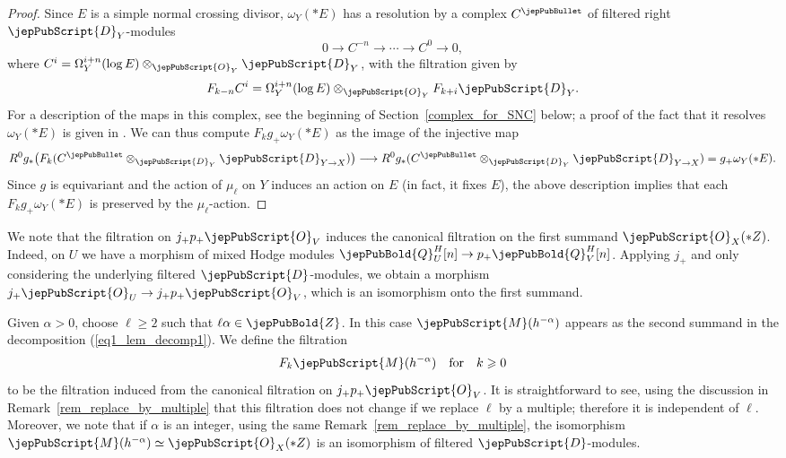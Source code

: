 \begin{proof}
Since $E$ is a simple normal crossing divisor, $\omega_Y(*E)$ has a resolution by a complex $C^\jepPubBullet$ 
of filtered right $\jepPubScript{D}_Y$-modules
$$0\longrightarrow C^{-n}\longrightarrow\cdots\longrightarrow C^0\longrightarrow 0,$$
where $C^{i}=\Omega_Y^{i+n}(\log E)\otimes_{\jepPubScript{O}_Y}\jepPubScript{D}_Y$, with the filtration given by
$$F_{k-n}C^i=\Omega_Y^{i+n}(\log E)\otimes_{\jepPubScript{O}_Y}F_{k+i}\jepPubScript{D}_Y.$$ 
For a description of the maps in this complex, see the beginning of Section~\ref{complex_for_SNC} below;
a proof
of the fact that it resolves $\omega_Y(*E)$ is given in \cite[Prop.~3.1]{MP1}. We can thus compute  $F_kg_+\omega_Y(*E)$ as the image of the injective map
$$R^0g_*\big(F_k(C^{\jepPubBullet}\otimes_{\jepPubScript{D}_Y}\jepPubScript{D}_{Y\to X})\big)\longrightarrow R^0g_*(C^{\jepPubBullet}\otimes_{\jepPubScript{D}_Y}\jepPubScript{D}_{Y\to X})=g_+\omega_Y(*E).$$
Since $g$ is equivariant and the action of $\mu_{\ell}$ on $Y$ induces an action on $E$ (in fact, it fixes $E$), the above description implies that each
$F_kg_+\omega_Y(*E)$ is preserved by the $\mu_{\ell}$-action.
\end{proof}

\begin{remark}\label{rmk_filtration_first_piece}
We note that the filtration on $j_+p_+\jepPubScript{O}_V$ induces the canonical filtration on the first summand $\jepPubScript{O}_X(*Z)$.
Indeed, on $U$ we have a morphism of mixed Hodge modules $\jepPubBold{Q}_U^H[n]\to p_+\jepPubBold{Q}_V^H[n]$. Applying $j_+$ and only considering the underlying filtered $\jepPubScript{D}$-modules, we obtain a morphism $j_+\jepPubScript{O}_U\to j_+p_+\jepPubScript{O}_V$, which is an isomorphism onto the first summand.
\end{remark}

\begin{definition}
Given $\alpha>0$, choose $\ell\geqslant 2$ such that $\ell\alpha\in\jepPubBold{Z}$. In this case $\jepPubScript{M}(h^{-\alpha})$ appears as the second summand in the decomposition
(\ref{eq1_lem_decomp1}). We define the filtration 
$$F_k \jepPubScript{M}(h^{-\alpha}) \,\,\,\,\,\,\text{for} \,\,\,\,\,\, k \geqslant 0$$ 
to be the filtration induced from the canonical filtration on $j_+p_+\jepPubScript{O}_V$. 
It is straightforward to see, using the discussion in Remark~\ref{rem_replace_by_multiple} that this filtration does not change if we replace $\ell$
by a multiple; therefore it is independent of $\ell$. Moreover, we note that if $\alpha$ is an integer, using the same Remark~\ref{rem_replace_by_multiple}, 
the isomorphism $\jepPubScript{M}(h^{-\alpha})\simeq\jepPubScript{O}_X(*Z)$ is an isomorphism of filtered $\jepPubScript{D}$-modules.
\end{definition}

